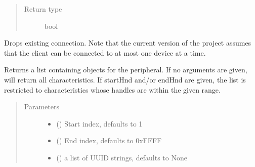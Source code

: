 \documentclass[letterpaper,10pt,english]{sphinxmanual}
\begin{document}
\begin{fulllineitems}
\begin{fulllineitems}
\begin{quote}
\begin{description}
\item[{Return type}] \leavevmode
bool

\end{description}\end{quote}

\end{fulllineitems}


\begin{fulllineitems}
\label{\detokenize{simpleble:simpleble.SimpleBleClient.disconnect}}
Drops existing connection. 
Note that the current version of the project assumes that the client can be connected to at most one device at a time.

\end{fulllineitems}


\begin{fulllineitems}
\label{\detokenize{simpleble:simpleble.SimpleBleClient.getCharacteristics}}
Returns a list containing  objects for the peripheral. If no arguments are given, will return all characteristics. If startHnd and/or endHnd are given, the list is restricted to characteristics whose handles are within the given range.
\begin{quote}\begin{description}
\item[{Parameters}] \leavevmode\begin{itemize}
\item {} 
 (\sphinxstyleliteralemphasis{\sphinxupquote{, }}) \textendash{} Start index, defaults to 1

\item {} 
 (\sphinxstyleliteralemphasis{\sphinxupquote{, }}) \textendash{} End index, defaults to 0xFFFF

\item {} 
 (\sphinxstyleliteralemphasis{\sphinxupquote{, }}) \textendash{} a list of UUID strings, defaults to None


\end{itemize}
\end{description}
\end{quote}
\end{fulllineitems}
\end{fulllineitems}
\end{document}
